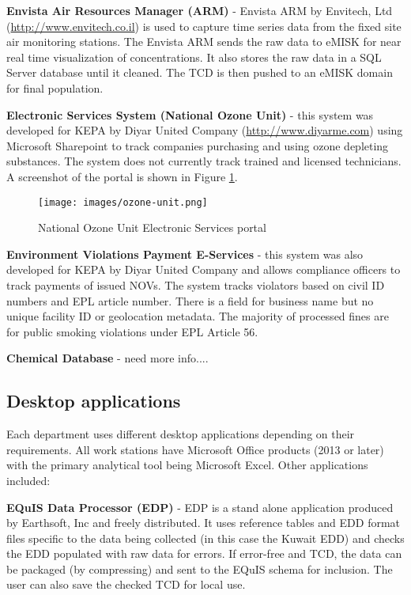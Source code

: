 \textbf{Envista Air Resources Manager (ARM)} - Envista ARM by Envitech, Ltd (\url{http://www.envitech.co.il}) is used to capture time series data from the fixed site air monitoring stations. The Envista ARM sends the raw data to eMISK for near real time visualization of concentrations. It also stores the raw data in a SQL Server database until it cleaned. The TCD is then pushed to an eMISK domain for final population. 

\textbf{Electronic Services System (National Ozone Unit)} - this system was developed for KEPA by Diyar United Company (\url{http://www.diyarme.com}) using Microsoft Sharepoint to track companies purchasing and using ozone depleting substances. The system does not currently track trained and licensed technicians. A screenshot of the portal is shown in Figure \ref{fig:ozone-unit}.

%
\begin{figure}[!htpb]
\centering
\texttt{[image: images/ozone-unit.png]} 
\caption{National Ozone Unit Electronic Services portal}
\label{fig:ozone-unit}
\end{figure}
%

\textbf{Environment Violations Payment E-Services} - this system was also developed for KEPA by Diyar United Company and allows compliance officers to track payments of issued NOVs. The system tracks violators based on civil ID numbers and EPL article number. There is a field for business name but no unique facility ID or geolocation metadata. The majority of processed fines are for public smoking violations under EPL Article 56.

\textbf{Chemical Database} - need more info....

\subsection{Desktop applications}

Each department uses different desktop applications depending on their requirements. All work stations have Microsoft Office products (2013 or later) with the primary analytical tool being Microsoft Excel. Other applications included:

\textbf{EQuIS Data Processor (EDP)} - EDP is a stand alone application produced by Earthsoft, Inc and freely distributed. It uses reference tables and EDD format files specific to the data being collected (in this case the Kuwait EDD) and checks the EDD populated with raw data for errors. If error-free and TCD, the data can be packaged (by compressing) and sent to the EQuIS schema for inclusion. The user can also save the checked TCD for local use.

